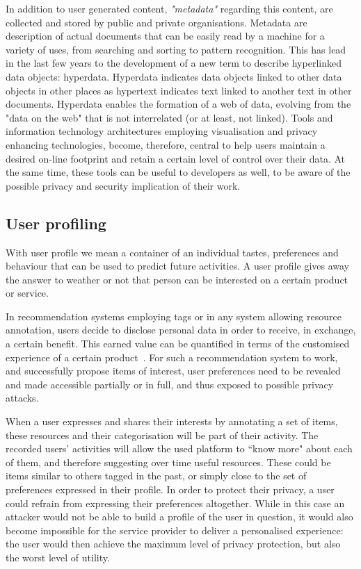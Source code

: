 In addition to user generated content, \emph{"meta­data"} regarding this content, are collected and stored by public and private organisations. Meta­data are description of actual documents that can be easily read by a machine for a variety of uses, from searching and sorting to pattern recognition. This has lead in the last few years to the development of a new term to describe hyperlinked data objects: hyperdata. Hyperdata indicates data objects linked to other data objects in other places as hypertext indicates text linked to another text in other documents. Hyperdata enables the formation of a web of data, evolving from the "data on the web" that is not interrelated (or at least, not linked). Tools and information technology architectures employing visualisation and privacy enhancing technologies, become, therefore, central to help users maintain a desired on-line footprint and retain a certain level of control over their data. At the same time, these tools can be useful to developers as well, to be aware of the possible privacy and security implication of their work.

\subsection{User profiling}

With user profile we mean a container of an individual tastes, preferences and behaviour that can be used to predict future activities. A user profile gives away the answer to weather or not that person can be interested on a certain product or service.

In recommendation systems employing tags or in any system allowing resource annotation, users decide to disclose personal data in order to receive, in exchange, a certain benefit. This earned value can be quantified in terms of the customised experience of a certain product~\cite{a01}. For such a recommendation system to work, and successfully propose items of interest, user preferences need to be revealed and made accessible partially or in full, and thus exposed to possible privacy attacks.

When a user expresses and shares their interests by annotating a set of items, these resources and their categorisation will be part of their activity. The recorded users' activities will allow the used platform to ``know more" about each of them, and therefore suggesting over time useful resources. These could be items similar to others tagged in the past, or simply close to the set of preferences expressed in their profile. In order to protect their privacy, a user could refrain from expressing their preferences altogether. While in this case an attacker would not be able to build a profile of the user in question, it would also become impossible for the service provider to deliver a personalised experience: the user would then achieve the maximum level of privacy protection, but also the worst level of utility.

